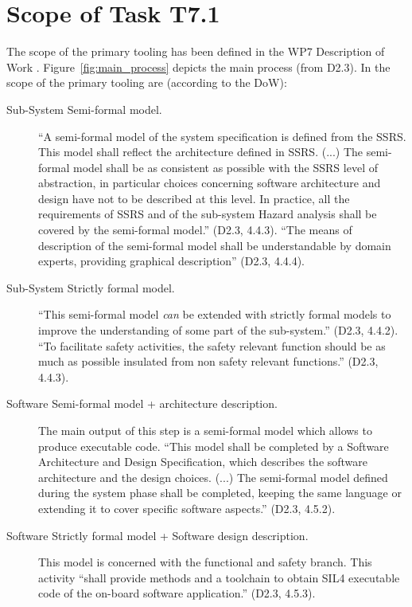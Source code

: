 \section{Scope of Task T7.1}

The scope of the primary tooling has been defined in the WP7 Description of Work \citep{WP7_D01}.  Figure~\ref{fig:main_process} depicts the main process (from D2.3).  In the scope of the primary tooling are (according to the DoW):

\begin{description}
  \item [Sub-System Semi-formal model.]  ``A semi-formal model of the system specification is defined from the SSRS. This model shall reflect the architecture defined in SSRS. (...) The semi-formal model shall be as consistent as possible with the SSRS level of abstraction, in particular choices concerning
software architecture and design have not to be described at this level. In practice, all the requirements of SSRS and of the sub-system Hazard analysis shall be covered by the semi-formal model.'' (D2.3, 4.4.3).  ``The means of description of the semi-formal model shall be understandable by domain experts, providing graphical description'' (D2.3, 4.4.4).

  \item [Sub-System Strictly formal model.] ``This semi-formal model \emph{can} be extended with strictly formal models to improve the understanding of some part of the sub-system.'' (D2.3, 4.4.2).  ``To facilitate safety activities, the safety relevant function should be as much as possible insulated from non safety relevant functions.'' (D2.3, 4.4.3).

  \item [Software Semi-formal model + architecture description.] The main output of this step is a semi-formal model which allows to produce executable code. ``This model shall be completed by a Software Architecture and Design Specification, which describes the software architecture and the design choices. (...) The semi-formal model defined during the system phase shall be completed, keeping the same language or extending it to cover specific software aspects.'' (D2.3, 4.5.2).

  \item [Software Strictly formal model + Software design description.]  This model is concerned with the functional and safety branch.  This activity ``shall provide methods and a toolchain to obtain SIL4 executable code of the on-board software application.'' (D2.3, 4.5.3).

\end{description}

